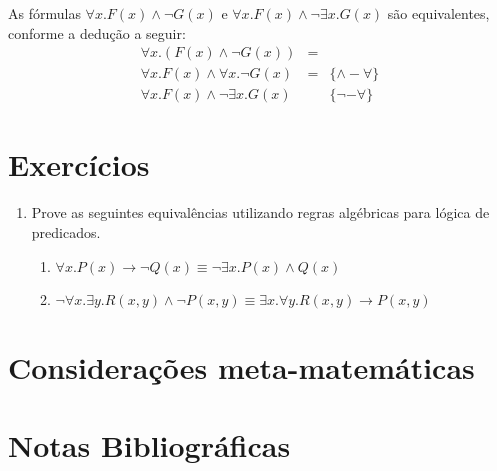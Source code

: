 \begin{Example}
As fórmulas $\forall x. F(x) \land \neg G(x)$ e $\forall x. F(x) \land
\neg \exists x. G(x)$ são equivalentes, conforme a dedução a seguir:
\[
      \begin{array}{lcl}
          \forall x.(F(x)\land\neg G(x)) & = & \\
	 \forall x.F(x)\land\forall x.\neg G(x) & = &\{\land-\forall\}\\
         \forall x.F(x)\land\neg\exists x.G(x) &  & \{\neg-\forall\}
      \end{array}
\]
\end{Example}

\section{Exercícios}

\begin{enumerate}
         \item Prove as seguintes equival\^encias utilizando regras alg\'ebricas para l\'ogica de predicados.
         \begin{enumerate}
            \item $\forall x. P(x) \rightarrow \neg Q(x) \equiv \neg \exists x. P(x) \land Q(x)$
            \item $\neg \forall x.\exists y. R(x,y)\land \neg P(x,y)\equiv\exists x.\forall y.R(x,y)\rightarrow P(x,y)$
         \end{enumerate}
\end{enumerate}

\section{Considerações meta-matemáticas}

\section{Notas Bibliográficas}